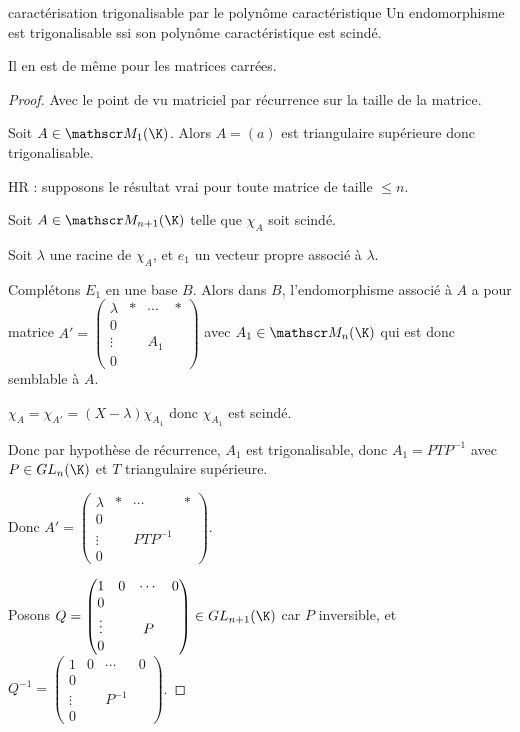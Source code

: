 \begin{theorement}{caractérisation trigonalisable par le polynôme caractéristique}{}
    Un endomorphisme est trigonalisable ssi son polynôme caractéristique est scindé. 

    Il en est de même pour les matrices carrées.
\end{theorement}


\begin{proof}
    Avec le point de vu matriciel par récurrence sur la taille de la matrice.

    Soit $A \in \mathscr M_1(\K)$. Alors $A = (a)$ est triangulaire supérieure donc trigonalisable.

    HR : supposons le résultat vrai pour toute matrice de taille $\leqslant n$. 

    Soit $A \in \mathscr M_{n + 1}(\K)$ telle que $\chi_A$ soit scindé.

    Soit $\lambda$ une racine de $\chi_A$, et $e_1$ un vecteur propre associé à $\lambda$.

    Complétons $E_1$ en une base $B$. Alors dans $B$, l'endomorphisme associé à $A$ a pour matrice 
    $A' = \begin{pmatrix}
        \lambda & * & \cdots & * \\
        0 & & & \\
        \vdots & & A_1 & \\
        0 & & &
    \end{pmatrix}$ avec $A_1 \in \mathscr M_n(\K)$ qui est donc semblable à $A$. 

    $\chi_A = \chi_{A'} = (X - \lambda) \chi_{A_1}$ donc $\chi_{A_1}$ est scindé.

    Donc par hypothèse de récurrence, $A_1$ est trigonalisable, donc
    $A_1 = P T P^{-1}$ avec $P \in GL_n(\K)$ et $T$ triangulaire supérieure.

    Donc $A' = \begin{pmatrix}
        \lambda & * & \cdots & * \\
        0 & & & \\
        \vdots & & P T P^{-1} & \\
        0 & & &
    \end{pmatrix}$.

    Posons $Q = \begin{pmatrix}
        1 & 0 & \cdots & 0 \\
        0 & & & \\
        \vdots & & P & \\
        0 & & &
    \end{pmatrix} \in GL_{n + 1}(\K)$ car $P$ inversible, et 
    $Q^{-1} = \begin{pmatrix}
        1 & 0 & \cdots & 0 \\
        0 & & & \\
        \vdots & & P^{-1} & \\
        0 & & &
    \end{pmatrix}$.


\end{proof}
